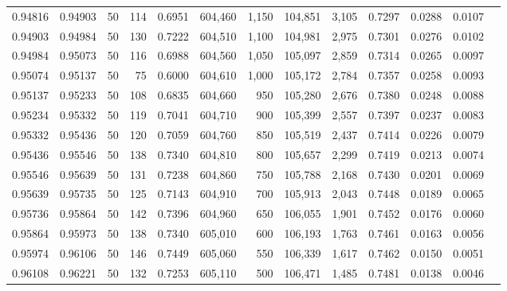 \begin{tabular}{rrrrrrrrrrrrr}
0.94816 & 0.94903 &    50 & 114 &                                     0.6951 & 604,460 &   1,150 & 104,851 &   3,105 & 0.7297 & 0.0288 & 0.0107 \\
0.94903 & 0.94984 &    50 & 130 &                                     0.7222 & 604,510 &   1,100 & 104,981 &   2,975 & 0.7301 & 0.0276 & 0.0102 \\
0.94984 & 0.95073 &    50 & 116 &                                     0.6988 & 604,560 &   1,050 & 105,097 &   2,859 & 0.7314 & 0.0265 & 0.0097 \\
0.95074 & 0.95137 &    50 &  75 &                                     0.6000 & 604,610 &   1,000 & 105,172 &   2,784 & 0.7357 & 0.0258 & 0.0093 \\
0.95137 & 0.95233 &    50 & 108 &                                     0.6835 & 604,660 &     950 & 105,280 &   2,676 & 0.7380 & 0.0248 & 0.0088 \\
0.95234 & 0.95332 &    50 & 119 &                                     0.7041 & 604,710 &     900 & 105,399 &   2,557 & 0.7397 & 0.0237 & 0.0083 \\
0.95332 & 0.95436 &    50 & 120 &                                     0.7059 & 604,760 &     850 & 105,519 &   2,437 & 0.7414 & 0.0226 & 0.0079 \\
0.95436 & 0.95546 &    50 & 138 &                                     0.7340 & 604,810 &     800 & 105,657 &   2,299 & 0.7419 & 0.0213 & 0.0074 \\
0.95546 & 0.95639 &    50 & 131 &                                     0.7238 & 604,860 &     750 & 105,788 &   2,168 & 0.7430 & 0.0201 & 0.0069 \\
0.95639 & 0.95735 &    50 & 125 &                                     0.7143 & 604,910 &     700 & 105,913 &   2,043 & 0.7448 & 0.0189 & 0.0065 \\
0.95736 & 0.95864 &    50 & 142 &                                     0.7396 & 604,960 &     650 & 106,055 &   1,901 & 0.7452 & 0.0176 & 0.0060 \\
0.95864 & 0.95973 &    50 & 138 &                                     0.7340 & 605,010 &     600 & 106,193 &   1,763 & 0.7461 & 0.0163 & 0.0056 \\
0.95974 & 0.96106 &    50 & 146 &                                     0.7449 & 605,060 &     550 & 106,339 &   1,617 & 0.7462 & 0.0150 & 0.0051 \\
0.96108 & 0.96221 &    50 & 132 &                                     0.7253 & 605,110 &     500 & 106,471 &   1,485 & 0.7481 & 0.0138 & 0.0046 \\

\end{tabular}
